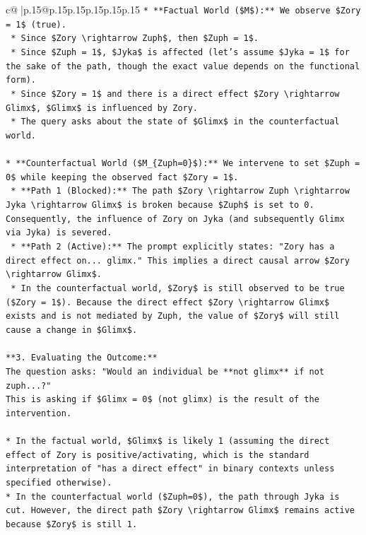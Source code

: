 \documentclass{article}
\begin{document}
{\begin{supertabular}{c@{$\;$}|p{.15\linewidth}@{}p{.15\linewidth}p{.15\linewidth}p{.15\linewidth}p{.15\linewidth}p{.15\linewidth}}
{{{\texttt{*   **Factual World (\$M\$):** We observe \$Zory = 1\$ (true).} \\
\texttt{    *   Since \$Zory \textbackslash{}rightarrow Zuph\$, then \$Zuph = 1\$.} \\
\texttt{    *   Since \$Zuph = 1\$, \$Jyka\$ is affected (let's assume \$Jyka = 1\$ for the sake of the path, though the exact value depends on the functional form).} \\
\texttt{    *   Since \$Zory = 1\$ and there is a direct effect \$Zory \textbackslash{}rightarrow Glimx\$, \$Glimx\$ is influenced by Zory.} \\
\texttt{    *   The query asks about the state of \$Glimx\$ in the counterfactual world.} \\
\\ 
\texttt{*   **Counterfactual World (\$M\_\{Zuph=0\}\$):** We intervene to set \$Zuph = 0\$ while keeping the observed fact \$Zory = 1\$.} \\
\texttt{    *   **Path 1 (Blocked):** The path \$Zory \textbackslash{}rightarrow Zuph \textbackslash{}rightarrow Jyka \textbackslash{}rightarrow Glimx\$ is broken because \$Zuph\$ is set to 0. Consequently, the influence of Zory on Jyka (and subsequently Glimx via Jyka) is severed.} \\
\texttt{    *   **Path 2 (Active):** The prompt explicitly states: "Zory has a direct effect on... glimx." This implies a direct causal arrow \$Zory \textbackslash{}rightarrow Glimx\$.} \\
\texttt{    *   In the counterfactual world, \$Zory\$ is still observed to be true (\$Zory = 1\$). Because the direct effect \$Zory \textbackslash{}rightarrow Glimx\$ exists and is not mediated by Zuph, the value of \$Zory\$ will still cause a change in \$Glimx\$.} \\
\\ 
\texttt{**3. Evaluating the Outcome:**} \\
\texttt{The question asks: "Would an individual be **not glimx** if not zuph...?"} \\
\texttt{This is asking if \$Glimx = 0\$ (not glimx) is the result of the intervention.} \\
\\ 
\texttt{*   In the factual world, \$Glimx\$ is likely 1 (assuming the direct effect of Zory is positive/activating, which is the standard interpretation of "has a direct effect" in binary contexts unless specified otherwise).} \\
\texttt{*   In the counterfactual world (\$Zuph=0\$), the path through Jyka is cut. However, the direct path \$Zory \textbackslash{}rightarrow Glimx\$ remains active because \$Zory\$ is still 1.} \\
}}}
\end{supertabular}}
\end{document}
